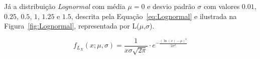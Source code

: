 Já a distribuição \textit{Lognormal} com média $ \mu = 0 $ e desvio padrão $\sigma$ com valores $ 0.01 $, $ 0.25 $, $ 0.5 $, $ 1 $, $ 1.25 $ e $ 1.5 $, descrita pela Equação~\eqref{eq:Lognormal} e ilustrada na Figura~\ref{fig:Lognormal}, representada por L($ \mu $,$ \sigma $).

\begin{equation}
{\displaystyle f_{L_X}(x;\mu ,\sigma )={\frac {1}{x\sigma {\sqrt {2\pi }}}}\cdot e^ {-\frac {\left(\ln(x)-\mu \right)^{2}}{2\sigma ^{2}}}}
\label{eq:Lognormal}
\end{equation}















